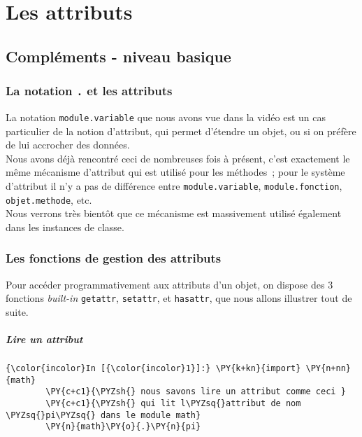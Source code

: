     \hypertarget{les-attributs}{%
\section{Les attributs}\label{les-attributs}}

    \hypertarget{compluxe9ments---niveau-basique}{%
\subsection{Compléments - niveau
basique}\label{compluxe9ments---niveau-basique}}

    \hypertarget{la-notation-.-et-les-attributs}{%
\subsubsection{\texorpdfstring{La notation \texttt{.} et les
attributs}{La notation . et les attributs}}\label{la-notation-.-et-les-attributs}}

    La notation \texttt{module.variable} que nous avons vue dans la vidéo
est un cas particulier de la notion d'attribut, qui permet d'étendre un
objet, ou si on préfère de lui accrocher des données.\\

Nous avons déjà rencontré ceci de nombreuses fois à présent, c'est
exactement le même mécanisme d'attribut qui est utilisé pour les
méthodes~; pour le système d'attribut il n'y a pas de différence entre
\texttt{module.variable}, \texttt{module.fonction},
\texttt{objet.methode}, etc.\\

Nous verrons très bientôt que ce mécanisme est massivement utilisé
également dans les instances de classe.

    \hypertarget{les-fonctions-de-gestion-des-attributs}{%
\subsubsection{Les fonctions de gestion des
attributs}\label{les-fonctions-de-gestion-des-attributs}}

    Pour accéder programmativement aux attributs d'un objet, on dispose des
3 fonctions \emph{built-in} \texttt{getattr}, \texttt{setattr}, et
\texttt{hasattr}, que nous allons illustrer tout de suite.

    \hypertarget{lire-un-attribut}{%
\subparagraph{Lire un attribut}\label{lire-un-attribut}}

    \begin{Verbatim}[commandchars=\\\{\}]
{\color{incolor}In [{\color{incolor}1}]:} \PY{k+kn}{import} \PY{n+nn}{math}
        \PY{c+c1}{\PYZsh{} nous savons lire un attribut comme ceci }
        \PY{c+c1}{\PYZsh{} qui lit l\PYZsq{}attribut de nom \PYZsq{}pi\PYZsq{} dans le module math}
        \PY{n}{math}\PY{o}{.}\PY{n}{pi}
\end{Verbatim}



